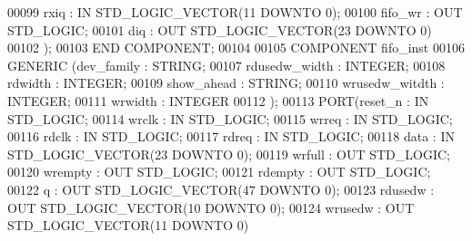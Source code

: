 \begin{DoxyCode}
00099          rxiq : \textcolor{keywordflow}{IN} \textcolor{comment}{STD\_LOGIC\_VECTOR}(\textcolor{vhdllogic}{}\textcolor{vhdllogic}{11} \textcolor{keywordflow}{DOWNTO} \textcolor{vhdllogic}{}\textcolor{vhdllogic}{0});
00100          fifo_wr : \textcolor{keywordflow}{OUT} \textcolor{comment}{STD\_LOGIC};
00101          diq : \textcolor{keywordflow}{OUT} \textcolor{comment}{STD\_LOGIC\_VECTOR}(\textcolor{vhdllogic}{}\textcolor{vhdllogic}{23} \textcolor{keywordflow}{DOWNTO} \textcolor{vhdllogic}{}\textcolor{vhdllogic}{0})
00102     );
00103 \textcolor{keywordflow}{END} \textcolor{keywordflow}{COMPONENT};
00104 
00105 \textcolor{keywordflow}{COMPONENT} fifo_inst
00106 \textcolor{keywordflow}{GENERIC} (dev_family : \textcolor{comment}{STRING};
00107             rdusedw_width : \textcolor{comment}{INTEGER};
00108             rdwidth : \textcolor{comment}{INTEGER};
00109             show_ahead : \textcolor{comment}{STRING};
00110             wrusedw_witdth : \textcolor{comment}{INTEGER};
00111             wrwidth : \textcolor{comment}{INTEGER}
00112             );
00113     \textcolor{keywordflow}{PORT}(reset_n : \textcolor{keywordflow}{IN} \textcolor{comment}{STD\_LOGIC};
00114          wrclk : \textcolor{keywordflow}{IN} \textcolor{comment}{STD\_LOGIC};
00115          wrreq : \textcolor{keywordflow}{IN} \textcolor{comment}{STD\_LOGIC};
00116          rdclk : \textcolor{keywordflow}{IN} \textcolor{comment}{STD\_LOGIC};
00117          rdreq : \textcolor{keywordflow}{IN} \textcolor{comment}{STD\_LOGIC};
00118          data : \textcolor{keywordflow}{IN} \textcolor{comment}{STD\_LOGIC\_VECTOR}(\textcolor{vhdllogic}{}\textcolor{vhdllogic}{23} \textcolor{keywordflow}{DOWNTO} \textcolor{vhdllogic}{}\textcolor{vhdllogic}{0});
00119          wrfull : \textcolor{keywordflow}{OUT} \textcolor{comment}{STD\_LOGIC};
00120          wrempty : \textcolor{keywordflow}{OUT} \textcolor{comment}{STD\_LOGIC};
00121          rdempty : \textcolor{keywordflow}{OUT} \textcolor{comment}{STD\_LOGIC};
00122          q : \textcolor{keywordflow}{OUT} \textcolor{comment}{STD\_LOGIC\_VECTOR}(\textcolor{vhdllogic}{}\textcolor{vhdllogic}{47} \textcolor{keywordflow}{DOWNTO} \textcolor{vhdllogic}{}\textcolor{vhdllogic}{0});
00123          rdusedw : \textcolor{keywordflow}{OUT} \textcolor{comment}{STD\_LOGIC\_VECTOR}(\textcolor{vhdllogic}{}\textcolor{vhdllogic}{10} \textcolor{keywordflow}{DOWNTO} \textcolor{vhdllogic}{}\textcolor{vhdllogic}{0});
00124          wrusedw : \textcolor{keywordflow}{OUT} \textcolor{comment}{STD\_LOGIC\_VECTOR}(\textcolor{vhdllogic}{}\textcolor{vhdllogic}{11} \textcolor{keywordflow}{DOWNTO} \textcolor{vhdllogic}{}\textcolor{vhdllogic}{0})

\end{DoxyCode}

